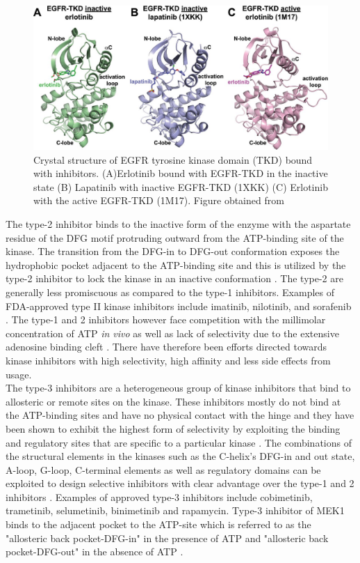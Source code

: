 \documentclass[a4paper, 11pt]{article}
\begin{document}
\begin{figure}[H]
	\includegraphics[width=.8\linewidth]{figures/erlotinib.jpg}
	\centering
	\caption{Crystal structure of EGFR tyrosine kinase domain (TKD) bound with inhibitors. (A)Erlotinib  bound with EGFR-TKD in the inactive state (B) Lapatinib with inactive EGFR-TKD (1XKK) (C) Erlotinib with the active EGFR-TKD (1M17). Figure obtained from \cite{park2012erlotinib}}
	\label{erlotinib}
\end{figure}
The type-2 inhibitor binds to the inactive form of the enzyme with the aspartate residue of the DFG motif protruding outward from the ATP-binding site of the kinase. The transition from the DFG-in to DFG-out conformation exposes the hydrophobic pocket adjacent to the ATP-binding site and this is utilized by the type-2 inhibitor to lock the kinase in an inactive conformation \cite{cowan2009structural}. The type-2 are generally less promiscuous as compared to the type-1 inhibitors. Examples of FDA-approved type II kinase inhibitors include imatinib, nilotinib, and sorafenib \cite{fabbro2015ten}. The type-1 and 2 inhibitors however face competition with the millimolar concentration of ATP \textit{in vivo} as well as lack of selectivity due to the extensive adenosine binding cleft \cite{lamba2012new}. There have therefore been  efforts directed towards kinase inhibitors with high selectivity, high affinity and less side effects from usage.\\
The type-3 inhibitors are a heterogeneous group of kinase inhibitors that bind to allosteric or remote sites on the kinase. These inhibitors mostly do not bind at the ATP-binding sites and have no physical contact with the hinge and they have been shown to exhibit the highest form of selectivity by exploiting the binding and regulatory sites that are specific to a particular kinase \cite{fabbro2015ten}. The combinations of the structural elements in the kinases such as the C-helix's DFG-in and out state, A-loop, G-loop, C-terminal elements as well as regulatory domains can be exploited to design selective inhibitors with clear advantage over the type-1 and 2 inhibitors \cite{cowan2009structural}. Examples of approved type-3 inhibitors include cobimetinib, trametinib, selumetinib, binimetinib and rapamycin. Type-3 inhibitor of MEK1 binds to the adjacent pocket to the ATP-site which is referred to as the "allosteric back pocket-DFG-in" in the presence of ATP and "allosteric back pocket-DFG-out" in the absence of ATP \cite{fabbro2015ten}. 
\end{document}
